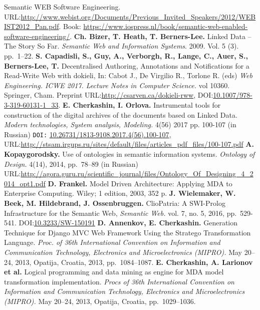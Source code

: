 \documentclass[runningheads]{llncs}
\begin{document}
\begin{thebibliography}{11}
 Semantic WEB Software Engineering. URL:\url{http://www.webist.org/Documents/Previous\_Invited\_Speakers/2012/WEBIST2012\_Pan.pdf}. Book: \url{https://www.iospress.nl/book/semantic-web-enabled-software-engineering/}.
 \textbf{Ch. Bizer, T. Heath, T. Berners-Lee.} Linked Data -- The Story So Far. \emph{Semantic Web and Information Systems}. 2009. Vol. 5 (3). pp.~1--22.
 \textbf{S. Capadisli, S., Guy, A., Verborgh, R., Lange, C., Auer, S., Berners-Lee, T.} Decentralised Authoring, Annotations and Notifications for a Read-Write Web with dokieli, In: Cabot J., De Virgilio R., Torlone R. (eds) \emph{Web Engineering. ICWE 2017. Lecture Notes in Computer Science.} vol 10360. Springer, Cham. Preprint URL:\url{http://csarven.ca/dokieli-rww}, DOI:\url{10.1007/978-3-319-60131-1_33}.
 \textbf{E. Cherkashin, I. Orlova.} Instrumental tools for construction of the digital archives of the documents based on Linked Data. \emph{Modern technologies, System analysis, Modeling.} 4(56) 2017 pp. 100-107 (in Russian) \texttt{DOI:} \url{10.26731/1813-9108.2017.4(56).100-107}, URL:\url{http://stsam.irgups.ru/sites/default/files/articles\_pdf\_files/100-107.pdf}
 \textbf{A. Kopaygorodsky.} Use of ontologies in semantic information systems. \emph{Ontology of Design.} 4(14), 2014, pp.~78--89 (in Russian) URL:\href{http://agora.guru.ru/scientific_journal/files/Ontology_Of_Designing_4_2014_opt1.pdf#page=79}{\ttfamily http://agora.guru.ru/scientific\_journal/files/On\-tology\_Of\_Designing\_4\_2014\_opt1.pdf}
 \textbf{D. Frankel.} Model Driven Architecture: Applying MDA to Enterprise Computing. Wiley; 1 edition, 2003, 352 p.
 \textbf{J. Wielemaker, W. Beek, M. Hildebrand, J. Ossenbruggen.} ClioPatria: A SWI-Prolog Infrastructure for the Semantic Web, \emph{Semantic Web.} vol. 7, no. 5, 2016, pp.~529-541. DOI:\url{10.3233/SW-150191}
 \textbf{D. Annenkov, E. Cherkashin.} Generation Technique for Django MVC Web Framework Using the Stratego Transformation Language. \emph{Proc. of 36th International Convention on Information and Communication Technology, Electronics and Microelectronics (MIPRO).} May 20--24, 2013, Opatija, Croatia, 2013, pp.~1084--1087.
 \textbf{E. Cherkashin, A. Larionov et al.} Logical programming and data mining as engine for MDA model transformation implementation. \emph{Procs of 36th International Convention on Information and Communication Technology, Electronics and Microelectronics (MIPRO).} May 20--24, 2013, Opatija, Croatia, pp.~1029--1036.

\end{thebibliography}
\end{document}
